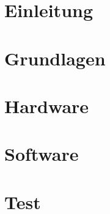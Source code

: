 \documentclass[10pt,a4paper,oneside]{99_fhnwreport_disposition}
\begin{document}
\listoftables
\listoffigures
\clearpage

\setcounter{page}{1}

\section{Einleitung}\label{sec:einleitung}

\clearpage

\section{Grundlagen}\label{sec:grundlagen}

\clearpage

\section{Hardware}\label{sec:hardware}

\clearpage


\section{Software}\label{sec:software}

\clearpage

\section{Test}\label{sec:test}

\clearpage

\end{document}
